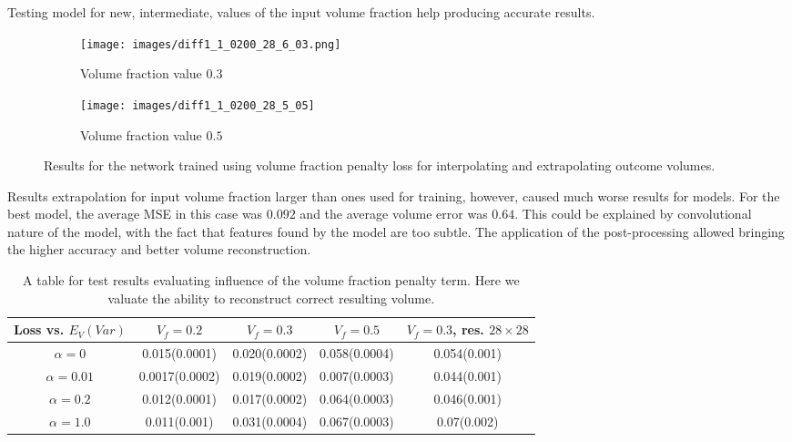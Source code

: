 Testing model for new, intermediate, values of the input volume fraction help producing accurate results.
\begin{figure}[H]
	\begin{subfigure}[b]{0.5\linewidth}
		\centering
		\texttt{[image: images/diff1\_1\_0200\_28\_6\_03.png]}
		\caption{Volume fraction value $0.3$}
		\label{fig:vf_example_1}
	\end{subfigure}
	\begin{subfigure}[b]{0.5\linewidth}
		\centering
		\texttt{[image: images/diff1\_1\_0200\_28\_5\_05]}
		\caption{Volume fraction value $0.5$ }
		\label{fig:vf_example_2}
	\end{subfigure}
 \caption{Results for the network trained using volume fraction penalty loss for interpolating and extrapolating outcome volumes.}
	\label{fig:vf_example}
\end{figure}
Results extrapolation for input volume fraction larger than ones used for training, however, caused much worse results for models. 
For the best model, the average MSE in this case was $0.092$ and the average volume error was $0.64$.
This could be explained by convolutional nature of the model, with the fact that features found by the model are too subtle.  
The application of the post-processing allowed bringing the higher accuracy and better volume reconstruction. 
\begin{table}[h]
	\begin{center}
		\begin{tabular}{ |c|c|c|c|c| }
			\hline
			Loss vs. $E_{V}(Var)$ & $V_f=0.2$ & $V_f=0.3$& $V_f=0.5$ &  $V_f=0.3$, res. $28\times 28$\\ 
			\hline
			$\alpha=0$ & 0.015(0.0001) & 0.020(0.0002) & 0.058(0.0004) & 0.054(0.001)  \\
			$\alpha=0.01$ & 0.0017(0.0002) & 0.019(0.0002) & 0.007(0.0003) & 0.044(0.001)\\
			$\alpha=0.2$ & 0.012(0.0001) & 0.017(0.0002)  & 0.064(0.0003)  & 0.046(0.001) \\
			$\alpha=1.0$ & 0.011(0.001) & 0.031(0.0004) & 0.067(0.0003) & 0.07(0.002) \\
			\hline
		\end{tabular}
	\end{center}
	\caption{A table for test results evaluating influence of the volume fraction penalty term. Here we valuate the ability to reconstruct correct resulting volume.}\label{tab:vf_full_vf}
\end{table}
\medskip 

